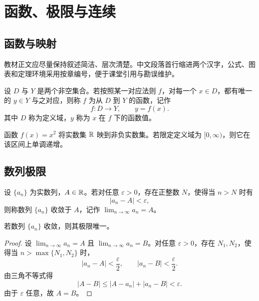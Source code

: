 \chapter{函数、极限与连续}

\section{函数与映射}

教材正文应尽量保持叙述简洁、层次清楚。中文段落首行缩进两个汉字，公式、图表和定理环境采用按章编号，便于课堂引用与勘误维护。

\begin{definition}[函数]
设 $D$ 与 $Y$ 是两个非空集合。若按照某一对应法则 $f$，对每一个 $x\in D$，都有唯一的 $y\in Y$ 与之对应，则称 $f$ 为从 $D$ 到 $Y$ 的函数，记作
\[
  f:D\to Y,\qquad y=f(x).
\]
其中 $D$ 称为定义域，$y$ 称为 $x$ 在 $f$ 下的函数值。
\end{definition}

\begin{example}
函数 $f(x)=x^2$ 将实数集 $\mathbb{R}$ 映到非负实数集。若限定定义域为 $[0,\infty)$，则它在该区间上单调递增。
\end{example}

\section{数列极限}

\begin{definition}[数列极限]
设 $\{a_n\}$ 为实数列，$A\in\mathbb{R}$。若对任意 $\varepsilon>0$，存在正整数 $N$，使得当 $n>N$ 时有
\begin{equation}
  |a_n-A|<\varepsilon,
  \label{eq:sequence-limit}
\end{equation}
则称数列 $\{a_n\}$ 收敛于 $A$，记作 $\lim_{n\to\infty}a_n=A$。
\end{definition}

\begin{theorem}[收敛数列的唯一性]
若数列 $\{a_n\}$ 收敛，则其极限唯一。
\end{theorem}

\begin{proof}
设 $\lim_{n\to\infty}a_n=A$ 且 $\lim_{n\to\infty}a_n=B$。对任意 $\varepsilon>0$，存在 $N_1,N_2$，使得当 $n>\max\{N_1,N_2\}$ 时，
\[
  |a_n-A|<\frac{\varepsilon}{2},\qquad |a_n-B|<\frac{\varepsilon}{2}.
\]
由三角不等式得
\[
  |A-B|\le |A-a_n|+|a_n-B|<\varepsilon.
\]
由于 $\varepsilon$ 任意，故 $A=B$。
\end{proof}

